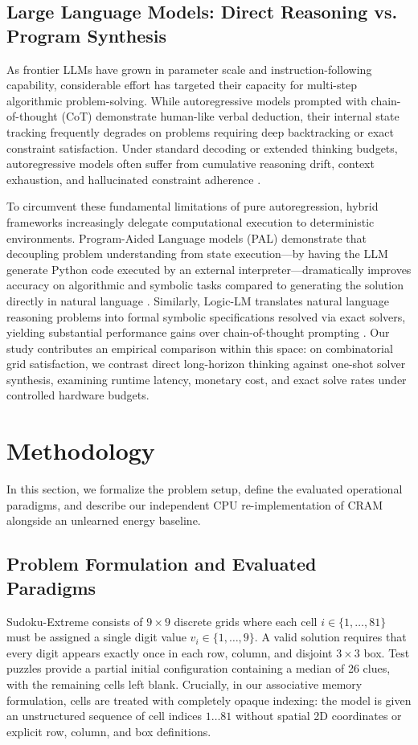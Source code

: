 \documentclass{article} %
\begin{document}
\subsection{Large Language Models: Direct Reasoning vs. Program Synthesis}
As frontier LLMs have grown in parameter scale and instruction-following capability, considerable effort has targeted their capacity for multi-step algorithmic problem-solving. While autoregressive models prompted with chain-of-thought (CoT) demonstrate human-like verbal deduction, their internal state tracking frequently degrades on problems requiring deep backtracking or exact constraint satisfaction. Under standard decoding or extended thinking budgets, autoregressive models often suffer from cumulative reasoning drift, context exhaustion, and hallucinated constraint adherence \citep{Gao2022PalProgramaided, Pan2023LogiclmEmpowering}.

To circumvent these fundamental limitations of pure autoregression, hybrid frameworks increasingly delegate computational execution to deterministic environments. Program-Aided Language models (PAL) demonstrate that decoupling problem understanding from state execution—by having the LLM generate Python code executed by an external interpreter—dramatically improves accuracy on algorithmic and symbolic tasks compared to generating the solution directly in natural language \citep{Gao2022PalProgramaided}. Similarly, Logic-LM translates natural language reasoning problems into formal symbolic specifications resolved via exact solvers, yielding substantial performance gains over chain-of-thought prompting \citep{Pan2023LogiclmEmpowering}. Our study contributes an empirical comparison within this space: on combinatorial grid satisfaction, we contrast direct long-horizon thinking against one-shot solver synthesis, examining runtime latency, monetary cost, and exact solve rates under controlled hardware budgets.

\section{Methodology}
\label{sec:method}
In this section, we formalize the problem setup, define the evaluated operational paradigms, and describe our independent CPU re-implementation of CRAM alongside an unlearned energy baseline.

\subsection{Problem Formulation and Evaluated Paradigms}
\label{sec:method_formulation}
Sudoku-Extreme consists of $9 \times 9$ discrete grids where each cell $i \in \{1, \dots, 81\}$ must be assigned a single digit value $v_i \in \{1, \dots, 9\}$. A valid solution requires that every digit appears exactly once in each row, column, and disjoint $3 \times 3$ box. Test puzzles provide a partial initial configuration containing a median of 26 clues, with the remaining cells left blank. Crucially, in our associative memory formulation, cells are treated with completely opaque indexing: the model is given an unstructured sequence of cell indices $1 \dots 81$ without spatial 2D coordinates or explicit row, column, and box definitions.
\end{document}
